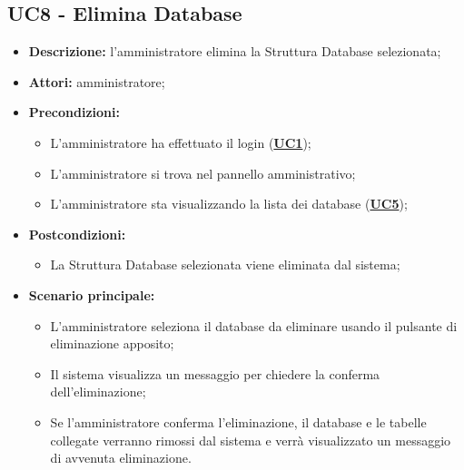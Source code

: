\subsection{UC8 - Elimina Database}
\label{sec:UC8}
\begin{itemize}
	\item \textbf{Descrizione:} l’amministratore elimina la Struttura Database selezionata;
	\item \textbf{Attori:} amministratore;
	\item \textbf{Precondizioni:} 
	\begin{itemize}
		\item L’amministratore ha effettuato il login (\hyperref[sec:UC1]{\textbf{UC1}});
		\item L’amministratore si trova nel pannello amministrativo;
		\item L’amministratore sta visualizzando la lista dei database (\hyperref[sec:UC5]{\textbf{UC5}});
	\end{itemize}
	\item \textbf{Postcondizioni:} 
	\begin{itemize}
		\item La Struttura Database selezionata viene eliminata dal sistema;
	\end{itemize}
	\item \textbf{Scenario principale:} 
	\begin{itemize}
		\item L'amministratore seleziona il database da eliminare usando il pulsante di eliminazione apposito;
		\item Il sistema visualizza un messaggio per chiedere la conferma dell'eliminazione;
		\item Se l'amministratore conferma l'eliminazione, il database e le tabelle collegate verranno rimossi dal sistema e verrà visualizzato un messaggio di avvenuta eliminazione.
	\end{itemize}
\end{itemize}

